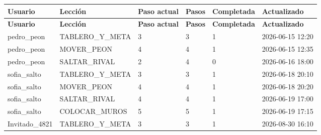 \begin{center}\footnotesize\setlength{\tabcolsep}{2pt}
\begin{longtable}{|L{78.3pt}|L{132.4pt}|L{44.5pt}|L{39.4pt}|L{54.4pt}|L{95.6pt}|}
\hline
\textbf{\hspace{0pt}Usuario} & \textbf{\hspace{0pt}Lección} & \textbf{\hspace{0pt}Paso actual} & \textbf{\hspace{0pt}Pasos} & \textbf{\hspace{0pt}Completada} & \textbf{\hspace{0pt}Actualizado} \\ \hline
\endfirsthead
\hline
\textbf{\hspace{0pt}Usuario} & \textbf{\hspace{0pt}Lección} & \textbf{\hspace{0pt}Paso actual} & \textbf{\hspace{0pt}Pasos} & \textbf{\hspace{0pt}Completada} & \textbf{\hspace{0pt}Actualizado} \\ \hline
\endhead
pedro\_\allowbreak{}peon & TABLERO\_\allowbreak{}Y\_\allowbreak{}META & 3 & 3 & 1 & 2026-06-15 12:20 \\ \hline
pedro\_\allowbreak{}peon & MOVER\_\allowbreak{}PEON & 4 & 4 & 1 & 2026-06-15 12:35 \\ \hline
pedro\_\allowbreak{}peon & SALTAR\_\allowbreak{}RIVAL & 2 & 4 & 0 & 2026-06-16 18:00 \\ \hline
sofia\_\allowbreak{}salto & TABLERO\_\allowbreak{}Y\_\allowbreak{}META & 3 & 3 & 1 & 2026-06-18 20:10 \\ \hline
sofia\_\allowbreak{}salto & MOVER\_\allowbreak{}PEON & 4 & 4 & 1 & 2026-06-18 20:20 \\ \hline
sofia\_\allowbreak{}salto & SALTAR\_\allowbreak{}RIVAL & 4 & 4 & 1 & 2026-06-19 17:00 \\ \hline
sofia\_\allowbreak{}salto & COLOCAR\_\allowbreak{}MUROS & 5 & 5 & 1 & 2026-06-19 17:15 \\ \hline
Invitado\_\allowbreak{}4821 & TABLERO\_\allowbreak{}Y\_\allowbreak{}META & 3 & 3 & 1 & 2026-08-30 16:10 \\ \hline
\end{longtable}
\end{center}
